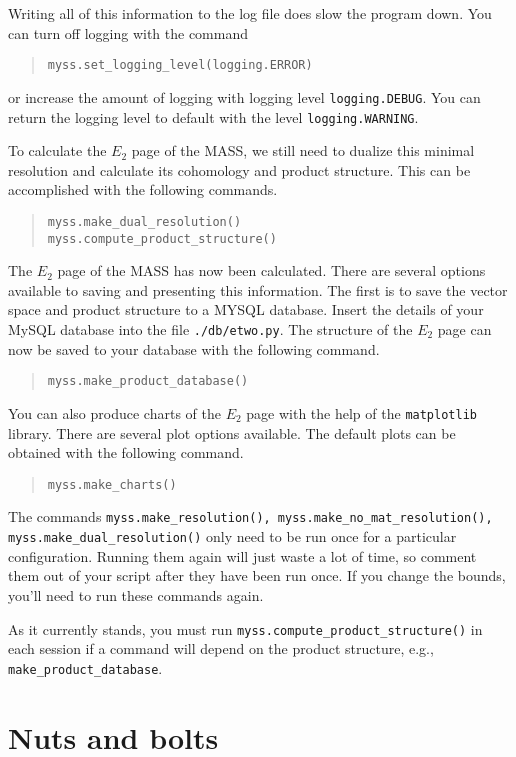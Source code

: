 \documentclass{article}
\begin{document}
Writing all of this information to the log file does slow the program
down. You can turn off logging with the command
\begin{quote}
\texttt{myss.set\_logging\_level(logging.ERROR)}
\end{quote}
or increase the amount of logging with logging level
\texttt{logging.DEBUG}. You can return the logging level to default
with the level \texttt{logging.WARNING}.

To calculate the $E_2$ page of the MASS, we still need to dualize this
minimal resolution and calculate its cohomology and product structure.
This can be accomplished with the following commands. 
\begin{quote}
\begin{verbatim}
myss.make_dual_resolution()
myss.compute_product_structure()
\end{verbatim}
\end{quote}
The $E_2$ page of the MASS has now been calculated. There are several
options available to saving and presenting this information. The first
is to save the vector space and product structure to a MYSQL
database. Insert the details of your MySQL database into the file
\texttt{./db/etwo.py}. The structure of the $E_2$ page can now be
saved to your database with the
following command.
\begin{quote}
\begin{verbatim}
myss.make_product_database()
\end{verbatim}
\end{quote}

You can also produce charts of the $E_2$ page with the help of the
\texttt{matplotlib} library. There are several plot options available.
The default plots can be obtained with the following command.
\begin{quote}
\begin{verbatim}
myss.make_charts()
\end{verbatim}
\end{quote}

The commands \texttt{myss.make\_resolution(),
  myss.make\_no\_mat\_resolution(), myss.make\_dual\_resolution()}
only need to be run once for a particular configuration. Running them
again will just waste a lot of time, so comment them out of your
script after they have been run once. If you change the bounds, you'll
need to run these commands again.

As it currently stands, you must run
\texttt{myss.compute\_product\_structure()} in each session if a
command will depend on the product structure, e.g.,
\texttt{make\_product\_database}.


\section{Nuts and bolts}
\end{document}
